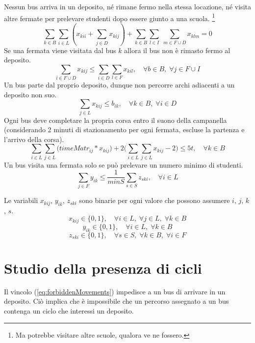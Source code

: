 Nessun bus arriva in un deposito, né rimane fermo nella stessa locazione, né visita altre fermate per prelevare studenti dopo essere giunto a una scuola. \footnote{Ma potrebbe visitare altre scuole, qualora ve ne fossero.}
\begin{equation}
  \label{eq:forbiddenMovements}
    \sum_{k \in B}\sum_{i \in L}(x_{kii} + \sum_{j \in D}x_{kij}) + \sum_{k \in B}\sum_{l \in I}\;\sum_{m \in F \cup D}x_{klm} = 0
\end{equation}
Se una fermata viene visitata dal bus $k$ allora il bus non è rimasto fermo al deposito.
\begin{equation}
    \sum_{i \in F \cup D}x_{kij} \leq \sum_{i \in D}\sum_{l \in F}x_{kil}, \quad \forall b \in B,\;\forall j \in F \cup I
\end{equation}
Un bus parte dal proprio deposito, dunque non percorre archi adiacenti a un deposito non suo.
\begin{equation}
  \sum_{j \in L}x_{kij} \leq b_{ik}, \quad \forall k \in B,\;\forall i \in D
\end{equation}
Ogni bus deve completare la propria corsa entro il suono della campanella (considerando 2 minuti di stazionamento per ogni fermata, escluse la partenza e l'arrivo della corsa).
\begin{equation}
  \sum_{i \in L}\sum_{j \in L}\Big(timeMatr_{ij} * x_{kij}\Big) + 2\Big(\sum_{i \in L}\sum_{j \in L} x_{kij} -2\Big) \leq 5t, \quad \forall k \in B
\end{equation}
Un bus visita una fermata solo se può prelevare un numero minimo di studenti.
\begin{equation}
  \sum_{j \in F}y_{ik} \leq \frac{1}{minS}\sum_{s \in S}z_{ski}, \quad \forall i \in L
\end{equation}

Le variabili $x_{kij}$, $y_{ik}$, $z_{ski}$ sono binarie per ogni valore che possono assumere $i$, $j$, $k$, $s$.
\begin{equation}
    x_{kij} \in \{0,1\},\quad \forall i \in L,\;\forall j \in L,\;\forall k \in B
\end{equation}
\begin{equation}
    y_{ik} \in \{0,1\},\quad \forall i \in L,\;\forall k \in B
\end{equation}
\begin{equation}
    z_{ski} \in \{0,1\},\quad \forall s \in S,\;\forall k \in B,\;\forall i \in F
\end{equation}

\section{Studio della presenza di cicli}
Il vincolo (\ref{eq:forbiddenMovements}) impedisce a un bus di arrivare in un deposito. Ciò implica che è impossibile che un percorso assegnato a un bus contenga un ciclo che interessi un deposito.

